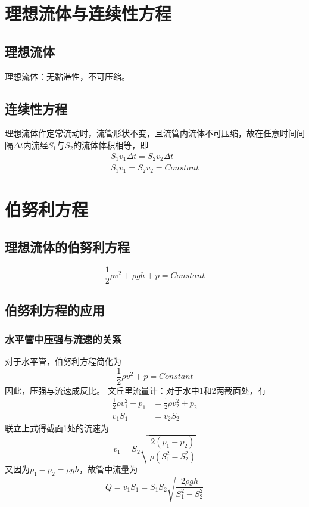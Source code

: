 \documentclass[12pt, a4paper, oneside]{ctexbook}
\begin{document}
\section{理想流体与连续性方程}
\subsection{理想流体}
理想流体：无黏滞性，不可压缩。
\subsection{连续性方程}
理想流体作定常流动时，流管形状不变，且流管内流体不可压缩，故在任意时间间隔$\Delta t$内流经$S_1$与$S_2$的流体体积相等，即
\begin{align*}
    S_1v_1\Delta t = S_2v_2\Delta t \\
    S_1v_1 = S_2v_2 = Constant
\end{align*}

\section{伯努利方程}
\subsection{理想流体的伯努利方程}
\begin{equation*}
    \frac{1}{2} \rho v^2 + \rho gh + p = Constant
\end{equation*}
\subsection{伯努利方程的应用}
\subsubsection{水平管中压强与流速的关系}
对于水平管，伯努利方程简化为
\begin{equation*}
    \frac{1}{2} \rho v^2 + p = Constant
\end{equation*}
因此，压强与流速成反比。
文丘里流量计：对于水中1和2两截面处，有
\begin{align*}
    \frac{1}{2} \rho v_1^2 + p_1 &= \frac{1}{2} \rho v_2^2 + p_2 \\
    v_1S_1 &= v_2S_2
\end{align*}
联立上式得截面1处的流速为
\begin{equation*}
    v_1 = S_2 \sqrt{\frac{2(p_1 - p_2)}{\rho(S_1^2 - S_2^2)}}
\end{equation*}
又因为$p_1 - p_2 = \rho gh$，故管中流量为
\begin{equation*}
    Q = v_1S_1 = S_1 S_2 \sqrt{\frac{2\rho g h}{S_1^2 - S_2^2}}
\end{equation*}
\end{document}
